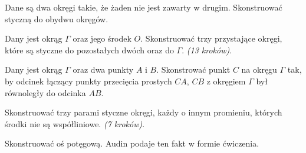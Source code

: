 \begin{problem}
    Dane są dwa okręgi takie, że żaden nie jest zawarty w drugim.
    Skonstruować styczną do obydwu okręgów.
\end{problem}

\begin{problem}
    Dany jest okrąg $\Gamma$ oraz jego środek $O$.
    Skonstruować trzy przystające okręgi, które są styczne do pozostałych dwóch oraz do $\Gamma$. \hfill \emph{(13 kroków)}. %
\end{problem}

\begin{problem}
    Dany jest okrąg $\Gamma$ oraz dwa punkty $A$ i $B$.
    Skonstrować punkt $C$ na okręgu $\Gamma$ tak, by odcinek łączący punkty przecięcia prostych $CA$, $CB$ z okręgiem $\Gamma$ był równoległy do odcinka $AB$.
\end{problem}

\begin{problem}
    Skonstruować trzy parami styczne okręgi, każdy o innym promieniu, których środki nie są współliniowe. \hfill \emph{(7 kroków)}. %
\end{problem}

Skonstruować oś potęgową.
Audin \cite[s. 107]{audin_2003} podaje ten fakt w formie ćwiczenia.
